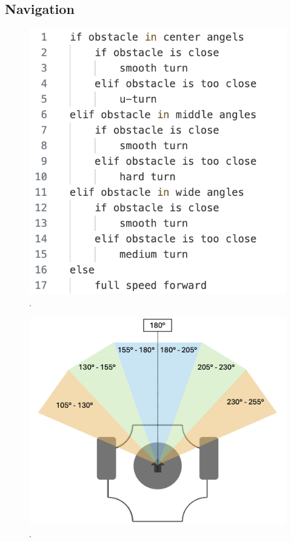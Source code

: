 \documentclass[conference]{IEEEtran}
\begin{document}
\subsection{Navigation}
\begin{figure}[htbp]
    \centerline{\includegraphics[width=0.6\columnwidth\hspace{-1.3cm}]{Pseudo.png}}
    \caption{.}
    \label{sec:pseudo}
    \end{figure}
\begin{figure}[htbp]
    \centerline{\includegraphics[width=0.9\columnwidth]{LiDAR Angels.png}}
    \caption{.}
    \label{sec:angles}
    \end{figure}
\end{document}
